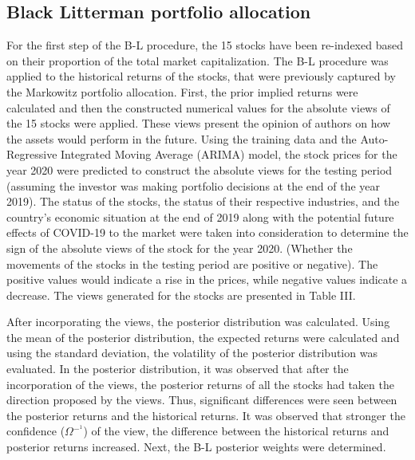 \documentclass[conference]{IEEEtran}
\begin{document}
\subsection{Black Litterman portfolio allocation}

For the first step of the B-L procedure, the 15 stocks have been re-indexed based on their proportion of the total market capitalization. The B-L procedure was applied to the historical returns of the stocks, that were previously captured by the Markowitz portfolio allocation. First, the prior implied returns were calculated and then the constructed numerical values for the absolute views of the 15 stocks were applied. These views present the opinion of authors on how the assets would perform in the future. Using the training data and the Auto-Regressive Integrated Moving Average (ARIMA) model, the stock prices for the year 2020 were predicted to construct the absolute views for the testing period (assuming the investor was making portfolio decisions at the end of the year 2019). The status of the stocks, the status of their respective industries, and the country's economic situation at the end of 2019 along with the potential future effects of COVID-19 to the market were taken into consideration to determine the sign of the absolute views of the stock for the year 2020. (Whether the movements of the stocks in the testing period are positive or negative). The positive values would indicate a rise in the prices, while negative values indicate a decrease. The views generated for the stocks are presented in Table III.

\begin{table}[htbp]
\caption{Stocks and the incorporated Views}\label{tab1}
\end{table}

After incorporating the views, the posterior distribution was calculated. Using the mean of the posterior distribution, the expected returns were calculated and using the standard deviation, the volatility of the posterior distribution was evaluated. In the posterior distribution, it was observed that after the incorporation of the views, the posterior returns of all the stocks had taken the direction proposed by the views. Thus, significant differences were seen between the posterior returns and the historical returns. It was observed that stronger the confidence ($\Omega$$^-^1$) of the view, the difference between the historical returns and posterior returns increased. Next, the B-L posterior weights were determined. 
\end{document}
